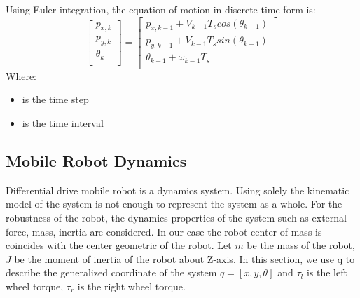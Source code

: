 Using Euler integration, the equation of motion in discrete time form is:
\begin{equation}
\begin{bmatrix}
p_{x,k}\\
p_{y,k}\\
\theta_{k}\\
\end{bmatrix}=
\begin{bmatrix}
p_{x,k-1} + V_{k-1} T_s cos(\theta_{k-1}) \\
p_{y,k-1} + V_{k-1} T_s sin(\theta_{k-1}) \\
\theta_{k-1} + \omega_{k-1} T_s\\
\end{bmatrix}
\end{equation}
Where:
\begin{itemize}
	\item { is the time step}
	\item { is the time interval}
\end{itemize}




\subsection{Mobile Robot Dynamics}
\hspace{1.27cm}
Differential drive mobile robot is a dynamics system. Using solely the kinematic model of the system is not enough to represent the system as a whole. For the robustness of the robot, the dynamics properties of the system such as external force, mass, inertia are considered. In our case the robot center of mass is coincides with the center geometric of the robot. Let \(m\) be the mass of the robot, \(J\) be the moment of inertia of the robot about Z-axis. In this section, we use q to describe the generalized coordinate of the system \(q=[x, y, \theta]\) and \(\tau_l\) is the left wheel torque, \(\tau_r\) is the right wheel torque.\par

